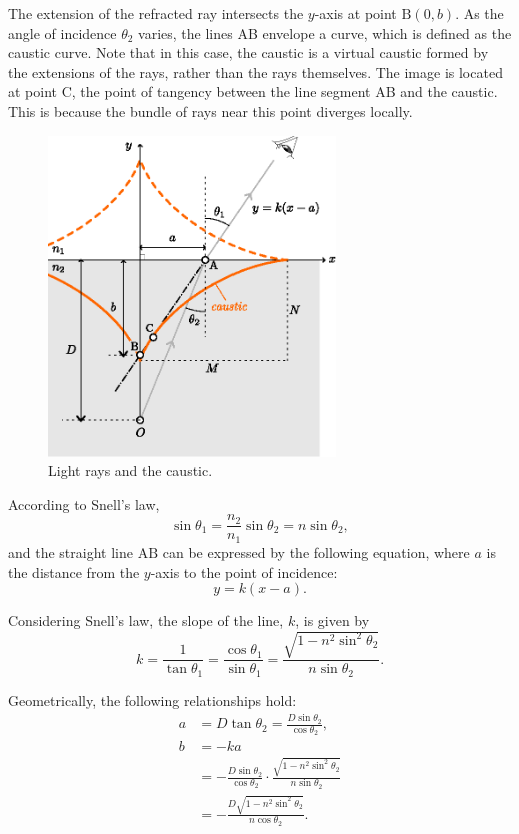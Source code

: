 \documentclass[twocolumn]{article}
\begin{document}
The extension of the refracted ray intersects the $y$-axis at point $\mathrm{B}(0, b)$. As the angle of incidence $\theta_2$ varies, the lines AB envelope a curve, which is defined as the caustic curve. Note that in this case, the caustic is a virtual caustic formed by the extensions of the rays, rather than the rays themselves. The image is located at point $\mathrm{C}$, the point of tangency between the line segment AB and the caustic. This is because the bundle of rays near this point diverges locally.

\begin{figure}
	\centering
	\includegraphics[width=3in]{figs/g237.eps}
	\caption{Light rays and the caustic.}
	\label{fig:geometry}
\end{figure}

According to Snell's law,
$$ \sin\theta_1 = \frac{n_2}{n_1} \sin\theta_2 = n\sin\theta_2,$$
and the straight line $\mathrm{AB}$ can be expressed by the following equation, where $a$ is the distance from the $y$-axis to the point of incidence:
$$y=k(x-a).$$

Considering Snell's law, the slope of the line, $k$, is given by
$$k=\dfrac{1}{\tan\theta_1}=\dfrac{\cos\theta_1}{\sin\theta_1}
=\dfrac{\sqrt{1-n^2\sin^2\theta_2}}{n\sin\theta_2}.$$

Geometrically, the following relationships hold:
$$\begin{aligned}
	a &= D\tan\theta_2 = \frac{D\sin\theta_2}{\cos\theta_2},\\
	b &= -ka \\
	&= -\frac{D\sin\theta_2}{\cos\theta_2} \cdot \frac{\sqrt{1-n^2\sin^2\theta_2}}{n\sin\theta_2}\\
	&= -\frac{D\sqrt{1-n^2\sin^2\theta_2}}{n\cos\theta_2}.
\end{aligned}$$
\end{document}
